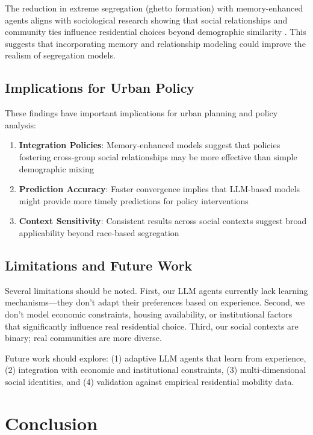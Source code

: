 \documentclass[pdflatex,sn-basic]{sn-jnl}%
\theoremstyle{thmstyleone}%
\theoremstyle{thmstyletwo}%
\theoremstyle{thmstylethree}%
\begin{document}
The reduction in extreme segregation (ghetto formation) with memory-enhanced agents aligns with sociological research showing that social relationships and community ties influence residential choices beyond demographic similarity \cite{Sampson2012}. This suggests that incorporating memory and relationship modeling could improve the realism of segregation models.

\subsection{Implications for Urban Policy}

These findings have important implications for urban planning and policy analysis:

\begin{enumerate}
\item \textbf{Integration Policies}: Memory-enhanced models suggest that policies fostering cross-group social relationships may be more effective than simple demographic mixing
\item \textbf{Prediction Accuracy}: Faster convergence implies that LLM-based models might provide more timely predictions for policy interventions
\item \textbf{Context Sensitivity}: Consistent results across social contexts suggest broad applicability beyond race-based segregation
\end{enumerate}

\subsection{Limitations and Future Work}

Several limitations should be noted. First, our LLM agents currently lack learning mechanisms—they don't adapt their preferences based on experience. Second, we don't model economic constraints, housing availability, or institutional factors that significantly influence real residential choice. Third, our social contexts are binary; real communities are more diverse.

Future work should explore: (1) adaptive LLM agents that learn from experience, (2) integration with economic and institutional constraints, (3) multi-dimensional social identities, and (4) validation against empirical residential mobility data.

\section{Conclusion}\label{sec:conclusion}
\end{document}
